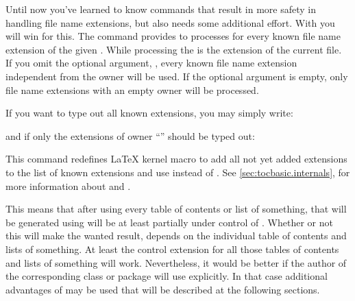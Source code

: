 \begin{Declaration}
\end{Declaration}
%
Until now you've learned to know commands that result in more safety in
handling file name extensions, but also needs some additional effort. With
 you will win for this. The command provides to
processes  for every known file name extension of the
given .  While processing the 
 is the extension of the current file.  If you omit the
optional argument, , every known file name extension
independent from the owner will be used. If the optional argument is empty,
only file name extensions with an empty owner will be processed.
\begin{Example}
  If you want to type out all known extensions, you may simply write:
\begin{lstcode}
  \doforeachtocfile{\typeout{\@currext}}
\end{lstcode}
  and if only the extensions of owner ``'' should be typed out:
\begin{lstcode}
  \doforeachtocfile[foo]{\typeout{\@currext}}
\end{lstcode}
\end{Example}
%

\begin{Declaration}
\end{Declaration}
%
This command redefines \LaTeX{} kernel macro  to add all not
yet added extensions to the list of known extensions and use
 instead of . See
\autoref{sec:tocbasic.internals},
 for more information about
 and .

This means that after using  every table of contents
or list of something, that will be generated using  will be
at least partially under control of . Whether or not this
will make the wanted result, depends on the individual table of contents and
lists of something. At least the  control extension for all
those tables of contents and lists of something will work. Nevertheless, it
would be better if the author of the corresponding class or package will use
 explicitly. In that case additional advantages of
 may be used that will be described at the following
sections.%
%

